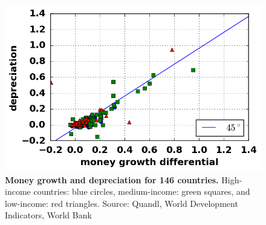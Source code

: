 \begin{figure}[h]
\caption{\label{fig_moneyDifferentialDepreciationOpen} \textbf{Money growth and depreciation for 146 countries.} High-income countries: blue circles, medium-income: green squares, and low-income: red triangles. {\tiny Source: Quandl, World Development Indicators, World Bank}}
\hspace*{-.5cm}\includegraphics[height = 7.cm]{fig_moneyDifferentialDepreciationOpen.png}
\end{figure}